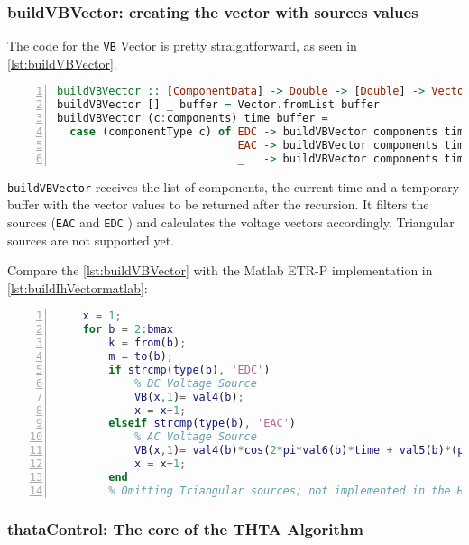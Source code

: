 \subsubsection{ buildVBVector: creating the vector with sources values }

The code for the \lstinline!VB! Vector is pretty straightforward, as seen in \cref{lst:buildVBVector}.

\begin{lstlisting}[language=Haskell, numbers=left, caption={Creating the vector with sources values: buildVBVector}, captionpos=b, label={lst:buildVBVector}]
buildVBVector :: [ComponentData] -> Double -> [Double] -> Vector Double
buildVBVector [] _ buffer = Vector.fromList buffer
buildVBVector (c:components) time buffer =
  case (componentType c) of EDC -> buildVBVector components time ((magnitude c) : buffer)
                            EAC -> buildVBVector components time (((magnitude c * cos (2 * pi * param2 c * time + (param1 c * (pi/180))))) : buffer)
                            _   -> buildVBVector components time buffer
\end{lstlisting}

\lstinline!buildVBVector! receives the list of components, the current time and a temporary buffer with the vector values to be returned after the recursion. It filters the sources (\lstinline!EAC! and \lstinline!EDC! ) and calculates the voltage vectors accordingly. Triangular sources are not supported yet.

Compare the \cref{lst:buildVBVector} with the Matlab ETR-P implementation in \cref{lst:buildIhVectormatlab}:

\begin{lstlisting}[language=Matlab, numbers=left, caption={VB vector buffer in Matlab ETR-P}, captionpos=b, label={lst:buildIhVectormatlab}]
%% Build the VB vector for the time t
    x = 1;
    for b = 2:bmax
        k = from(b);
        m = to(b);
        if strcmp(type(b), 'EDC')
            % DC Voltage Source
            VB(x,1)= val4(b);
            x = x+1;
        elseif strcmp(type(b), 'EAC')
            % AC Voltage Source
            VB(x,1)= val4(b)*cos(2*pi*val6(b)*time + val5(b)*(pi/180) );
            x = x+1;
        end
        % Omitting Triangular sources; not implemented in the Haskell Version
\end{lstlisting}


\subsubsection{ thataControl: The core of the THTA Algorithm }

